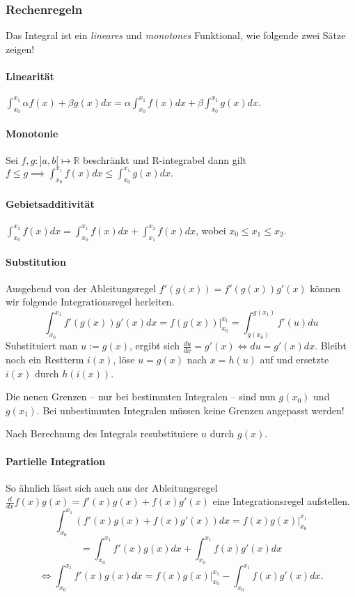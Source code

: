 \documentclass[a4paper, 9pt, DIV=24]{scrartcl}
\begin{document}
\subsubsection{Rechenregeln}
Das Integral ist ein \emph{lineares} und \emph{monotones} Funktional, wie folgende zwei Sätze zeigen!
\paragraph{Linearität}
$\int_{x_0}^{x_1}\alpha f(x) + \beta g(x) dx = \alpha\int_{x_0}^{x_1}f(x)dx + \beta\int_{x_0}^{x_1}g(x)dx.$
\paragraph{Monotonie}
Sei $f,g : ]a,b[ \mapsto \mathbb{R}$ beschränkt und R-integrabel dann gilt
$ f \leq g \implies \int_{x_0}^{x_1}f(x)dx \leq \int_{x_0}^{x_1}g(x)dx. $
\paragraph{Gebietsadditivität}
$\int_{x_0}^{x_2}f(x)dx = \int_{x_0}^{x_1}f(x)dx + \int_{x_1}^{x_2}f(x)dx$, wobei $x_0 \leq x_1 \leq x_2$.

\paragraph{Substitution}
Ausgehend von der Ableitungsregel $f'(g(x)) = f'(g(x))g'(x)$ können wir folgende Integrationsregel herleiten.
\[ \int_{x_0}^{x_1}f'(g(x))g'(x)dx = f(g(x))|_{x_0}^{x_1} = \int_{g(x_0)}^{g(x_1)}f'(u)du \]
Substituiert man $u := g(x)$, ergibt sich $\frac{du}{dx} = g'(x) \iff du = g'(x)dx$.
Bleibt noch ein Restterm $i(x)$, löse $u = g(x)$ nach $x = h(u)$ auf und ersetzte $i(x)$ durch $h(i(x))$.

Die neuen Grenzen -- nur bei bestimmten Integralen -- sind nun $g(x_0)$ und $g(x_1)$.
Bei unbestimmten Integralen müssen keine Grenzen angepasst werden!

Nach Berechnung des Integrals resubstituiere $u$ durch $g(x)$.

\paragraph{Partielle Integration}
So ähnlich lässt sich auch aus der Ableitungsregel $\frac{d}{dx}f(x)g(x) = f'(x)g(x) + f(x)g'(x)$ eine Integrationsregel aufstellen.
\[ \int_{x_0}^{x_1}(f'(x)g(x)+f(x)g'(x))dx = f(x)g(x)|_{x_0}^{x_1} \]
\[ = \int_{x_0}^{x_1}f'(x)g(x)dx + \int_{x_0}^{x_1}f(x)g'(x)dx \]
\[ \iff \int_{x_0}^{x_1}f'(x)g(x)dx = f(x)g(x)|_{x_0}^{x_1} - \int_{x_0}^{x_1}f(x)g'(x)dx. \]
\end{document}
